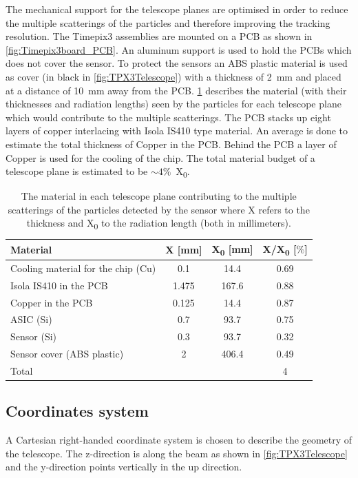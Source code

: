 The mechanical support for the telescope planes are optimised in order
to reduce the multiple scatterings of the particles and therefore
improving the tracking resolution. The Timepix3 assemblies are mounted
on a PCB as shown in \cref{fig:Timepix3board_PCB}. An aluminum support
is used to hold the PCBs which does not cover the sensor. To protect
the sensors an ABS plastic material is used as cover (in black in
\cref{fig:TPX3Telescope}) with a thickness of 2~mm and placed at a
distance of 10~mm away from the PCB. \cref{tab:TPX3TelescopeMaterial}
describes the material (with their thicknesses and radiation lengths)
seen by the particles for each telescope plane which would contribute
to the multiple scatterings. The PCB stacks up eight layers of copper
interlacing with Isola IS410 type material. An average is done to
estimate the total thickness of Copper in the PCB. Behind the PCB a
layer of Copper is used for the cooling of the chip. The total
material budget of a telescope plane is estimated to be
$\sim4\%$~X\textsubscript{0}.

\begin{table}[htbp]
  \centering
  \caption{The material in each telescope plane contributing to the
    multiple scatterings of the particles detected by the sensor where
    X refers to the thickness and X\textsubscript{0} to the radiation
    length (both in millimeters).}
  \label{tab:TPX3TelescopeMaterial}
  \begin{tabular}{l c c c}
    \toprule
    Material & X [mm] & X\textsubscript{0} [mm] & X/X\textsubscript{0} [$\%$] \\
    \midrule
    Cooling material for the chip (Cu) & 0.1 & 14.4 & 0.69 \\
    Isola IS410 in the PCB & 1.475 & 167.6 & 0.88 \\
    Copper in the PCB & 0.125 & 14.4 & 0.87 \\
    ASIC (Si) & 0.7 & 93.7 & 0.75\\
    Sensor (Si) & 0.3 & 93.7 & 0.32\\ 
    Sensor cover (ABS plastic) & 2 & 406.4 & 0.49 \\ \hline
    Total & & & 4 \\
    \bottomrule
  \end{tabular}
\end{table}

\subsection{Coordinates system}
A Cartesian right-handed coordinate system is chosen to describe the
geometry of the telescope. The z-direction is along the beam as shown
in \cref{fig:TPX3Telescope} and the y-direction points vertically in
the up direction.

